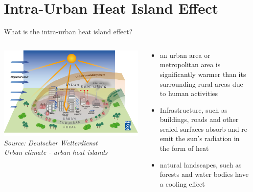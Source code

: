 
\section{Intra-Urban Heat Island Effect}
\begin{frame}{What is the intra-urban heat island effect?}
	\begin{columns}[T] %
		\begin{column}{.48\textwidth}
			\includegraphics[width=\linewidth]{images/urbanheatisland_01.png}\\
			\textit{\footnotesize Source: Deutscher Wetterdienst\\Urban climate - urban heat islands}
		\end{column}%
		\hfill%
		\begin{column}{.56\textwidth}
			\begin{itemize}
				\item \glqq{}{[\textellipsis]} an urban area or metropolitan area is significantly warmer than its surrounding rural areas due to human activities\grqq{}\cite{takebayashi_chapter_2020}
				\item Infrastructure, such as buildings, roads and other sealed surfaces absorb and re-emit the sun's radiation in the form of heat
				\item natural landscapes, such as forests and water bodies have a cooling effect\cite{us_epa_learn_2014}
			\end{itemize}
		\end{column}%
	\end{columns}
\end{frame}
